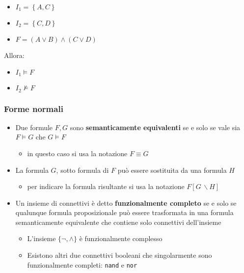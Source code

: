 \documentclass[italian, 10pt]{article}
\begin{document}
\begin{itemize}
  \item \(I_1 = \left\{ A, C\right\}\)
  \item \(I_2 = \left\{ C, D\right\}\)
  \item \(F = (A \lor B) \land (C \lor D)\)
\end{itemize}

Allora:

\begin{itemize}
  \item \(I_1 \vDash F\)
  \item \(I_2 \nvDash F\)
\end{itemize}

\subsubsection{Forme normali}
\label{sec:forme-normali-PL}

\begin{itemize}
  \item Due formule \(F, G\) sono \textbf{semanticamente equivalenti} se e solo se vale sia \(F \vDash G\) che \(G \vDash F\)
        \begin{itemize}[label=\(\rightarrow\)]
          \item in questo caso si usa la notazione \(F \equiv G\)
        \end{itemize}
  \item La formula \(G\), sotto formula di \(F\) può essere sostituita da una formula \(H\)
        \begin{itemize}[label=\(\rightarrow\)]
          \item per indicare la formula risultante si usa la notazione \(F [G \, \backslash H]\)
        \end{itemize}
  \item Un insieme di connettivi è detto \textbf{funzionalmente completo} se e solo se qualunque formula proposizionale può essere trasformata in una formula semanticamente equivalente che contiene solo connettivi dell'insieme
        \begin{itemize}[label=\(\rightarrow\)]
          \item L'insieme \(\{\lnot, \land\}\) è funzionalmente complesso
          \item Esistono altri due connettivi booleani che singolarmente sono funzionalmente completi: \texttt{nand} e \texttt{nor}
        \end{itemize}
\end{itemize}
\end{document}
